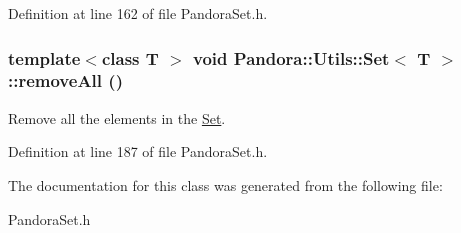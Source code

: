 Definition at line 162 of file PandoraSet.h.\hypertarget{classPandora_1_1Utils_1_1Set_aa134d362ed2baacc3ca0864cb6f10cb7}{
\subsubsection[{removeAll}]{\setlength{\rightskip}{0pt plus 5cm}template$<$class T $>$ void {\bf Pandora::Utils::Set}$<$ T $>$::removeAll ()}}
\label{classPandora_1_1Utils_1_1Set_aa134d362ed2baacc3ca0864cb6f10cb7}


Remove all the elements in the \hyperlink{classPandora_1_1Utils_1_1Set}{Set}. 

Definition at line 187 of file PandoraSet.h.

The documentation for this class was generated from the following file:\begin{DoxyCompactItemize}
\item 
PandoraSet.h\end{DoxyCompactItemize}
